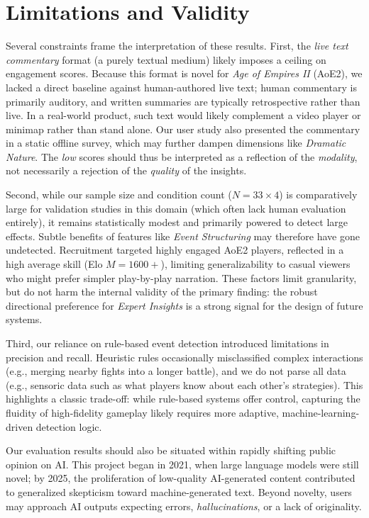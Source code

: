 \section{Limitations and Validity}

Several constraints frame the interpretation of these results. First, the \textit{live text commentary} format (a purely textual medium) likely imposes a ceiling on engagement scores. Because this format is novel for \textit{Age of Empires II} (AoE2), we lacked a direct baseline against human-authored live text; human commentary is primarily auditory, and written summaries are typically retrospective rather than live. In a real-world product, such text would likely complement a video player or minimap rather than stand alone. Our user study also presented the commentary in a static offline survey, which may further dampen dimensions like \textit{Dramatic Nature}. The \textit{low} scores should thus be interpreted as a reflection of the \textit{modality}, not necessarily a rejection of the \textit{quality} of the insights.

Second, while our sample size and condition count ($N=33\times4$) is comparatively large for validation studies in this domain (which often lack human evaluation entirely), it remains statistically modest and primarily powered to detect large effects. Subtle benefits of features like \textit{Event Structuring} may therefore have gone undetected. Recruitment targeted highly engaged AoE2 players, reflected in a high average skill (Elo $M=1600+$), limiting generalizability to casual viewers who might prefer simpler play-by-play narration. These factors limit granularity, but do not harm the internal validity of the primary finding: the robust directional preference for \textit{Expert Insights} is a strong signal for the design of future systems.

Third, our reliance on rule-based event detection introduced limitations in precision and recall. Heuristic rules occasionally misclassified complex interactions (e.g., merging nearby fights into a longer battle), and we do not parse all data (e.g., sensoric data such as what players know about each other's strategies). This highlights a classic trade-off: while rule-based systems offer control, capturing the fluidity of high-fidelity gameplay likely requires more adaptive, machine-learning-driven detection logic.

Our evaluation results should also be situated within rapidly shifting public opinion on AI. This project began in 2021, when large language models were still novel; by 2025, the proliferation of low-quality AI-generated content contributed to generalized skepticism toward machine-generated text. Beyond novelty, users may approach AI outputs expecting errors, \textit{hallucinations}, or a lack of originality.

